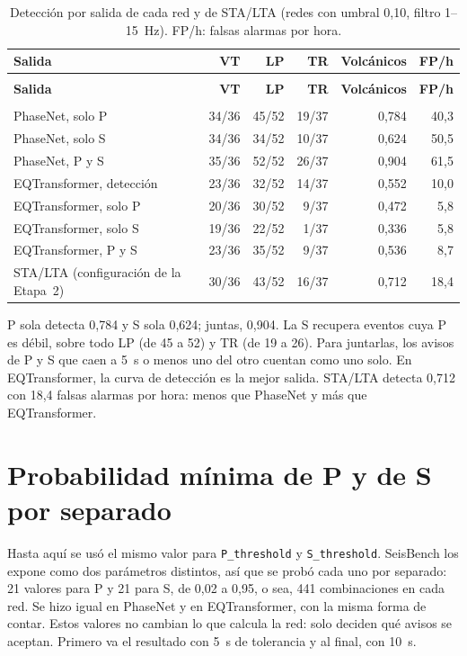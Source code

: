 \documentclass[11pt,a4paper,oneside,spanish,oldfontcommands]{memoir}
\newcommand{\cabecera}[2]{%
  \toprule #1 \\ \midrule \endfirsthead
  \multicolumn{#2}{l}{\itshape Cuadro \thetable{} (continuación)}\\
  \toprule #1 \\ \midrule \endhead
  \midrule \multicolumn{#2}{r}{\itshape Continúa en la página siguiente}\\ \endfoot
  \bottomrule \endlastfoot}
\begin{document}
{\small
\setlength{\tabcolsep}{5pt}
\begin{longtable}{>{\raggedright\arraybackslash}p{5.2cm}rrrrr}
\caption{Detección por salida de cada red y de STA/LTA (redes con umbral 0,10, filtro 1--15~Hz). FP/h: falsas alarmas por hora.}\label{tab:salidas}\\
\cabecera{\textbf{Salida} & \textbf{VT} & \textbf{LP} & \textbf{TR} & \textbf{Volcánicos} & \textbf{FP/h}}{6}
PhaseNet, solo P & 34/36 & 45/52 & 19/37 & 0,784 & 40,3 \\
PhaseNet, solo S & 34/36 & 34/52 & 10/37 & 0,624 & 50,5 \\
PhaseNet, P y S & 35/36 & 52/52 & 26/37 & 0,904 & 61,5 \\
\midrule
EQTransformer, detección & 23/36 & 32/52 & 14/37 & 0,552 & 10,0 \\
EQTransformer, solo P & 20/36 & 30/52 & 9/37 & 0,472 & 5,8 \\
EQTransformer, solo S & 19/36 & 22/52 & 1/37 & 0,336 & 5,8 \\
EQTransformer, P y S & 23/36 & 35/52 & 9/37 & 0,536 & 8,7 \\
\midrule
STA/LTA (configuración de la Etapa~2) & 30/36 & 43/52 & 16/37 & 0,712 & 18,4 \\
\end{longtable}
}

P sola detecta 0,784 y S sola 0,624; juntas, 0,904. La S recupera eventos
cuya P es débil, sobre todo LP (de 45 a 52) y TR (de 19 a 26). Para juntarlas,
los avisos de P y S que caen a 5~s o menos uno del otro cuentan como uno solo.
En EQTransformer, la curva de detección es la mejor salida. STA/LTA detecta
0,712 con 18,4 falsas alarmas por hora: menos que PhaseNet y más que
EQTransformer.

\section{Probabilidad mínima de P y de S por separado}\label{sec:ps}

Hasta aquí se usó el mismo valor para \texttt{P\_threshold} y
\texttt{S\_threshold}. SeisBench los expone como dos parámetros distintos, así
que se probó cada uno por separado: 21 valores para P
y 21 para S, de 0,02 a 0,95, o sea, 441 combinaciones en cada red. Se hizo
igual en PhaseNet y en EQTransformer, con la misma forma de contar. Estos valores no
cambian lo que calcula la red: solo deciden qué avisos se aceptan. Primero va el
resultado con 5~s de tolerancia y al final, con 10~s.
\end{document}
